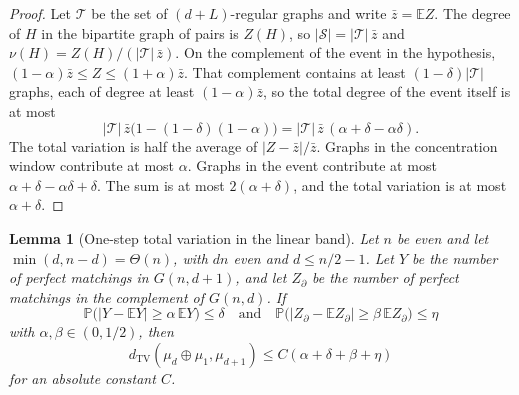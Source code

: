 \documentclass[11pt]{article}
\newtheorem{lemma}[theorem]{Lemma}
\newcommand{\EE}{\mathbb{E}}
\newcommand{\PP}{\mathbb{P}}
\newcommand{\dTV}{d_{\mathrm{TV}}}
\begin{document}
\begin{proof}
Let \(\mathcal{T}\) be the set of \((d+L)\)-regular graphs and write \(\bar z=\EE Z\). The degree of \(H\) in the bipartite graph of pairs is \(Z(H)\), so \(|\mathcal{S}|=|\mathcal{T}|\,\bar z\) and \(\nu(H)=Z(H)/(|\mathcal{T}|\,\bar z)\).
On the complement of the event in the hypothesis, \((1-\alpha)\bar z\le Z\le(1+\alpha)\bar z\). That complement contains at least \((1-\delta)|\mathcal{T}|\) graphs, each of degree at least \((1-\alpha)\bar z\), so the total degree of the event itself is at most
\[
|\mathcal{T}|\,\bar z\bigl(1-(1-\delta)(1-\alpha)\bigr)
=
|\mathcal{T}|\,\bar z\,(\alpha+\delta-\alpha\delta).
\]
The total variation is half the average of \(|Z-\bar z|/\bar z\). Graphs in the concentration window contribute at most \(\alpha\). Graphs in the event contribute at most \(\alpha+\delta-\alpha\delta+\delta\). The sum is at most \(2(\alpha+\delta)\), and the total variation is at most \(\alpha+\delta\).
\end{proof}

\begin{lemma}[One-step total variation in the linear band]
\label{lem:linear-tv}
Let \(n\) be even and let \(\min(d,n-d)=\Theta(n)\), with \(dn\) even and \(d\le n/2-1\).
Let \(Y\) be the number of perfect matchings in \(G(n,d+1)\), and let \(Z_\partial\) be the number of perfect matchings in the complement of \(G(n,d)\).
If
\[
\PP\bigl(|Y-\EE Y|\ge\alpha\,\EE Y\bigr)\le\delta
\quad\text{and}\quad
\PP\bigl(|Z_\partial-\EE Z_\partial|\ge\beta\,\EE Z_\partial\bigr)\le\eta
\]
with \(\alpha,\beta\in(0,1/2)\), then
\[
\dTV(\mu_d\oplus\mu_1,\mu_{d+1})\le C(\alpha+\delta+\beta+\eta)
\]
for an absolute constant \(C\).
\end{lemma}
\end{document}
